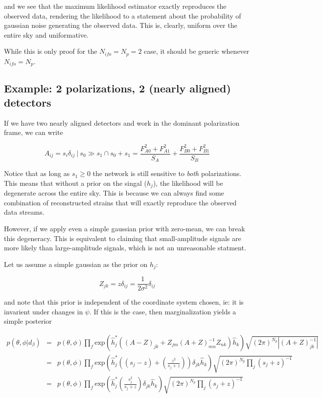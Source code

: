 \documentclass[10pt]{article}
\begin{document}
and we see that the maximum likelihood estimator exactly reproduces the observed data, rendering the likelihood to a statement about the probability of gaussian noise generating the observed data. This is, clearly, uniform over the entire sky and uniformative.

While this is only proof for the $N_{ifo}=N_{p}=2$ case, it should be generic whenever $N_{ifo}=N_{p}$.


\subsection{Example: 2 polarizations, 2 (nearly aligned) detectors}

If we have two nearly aligned detectors and work in the dominant polarization frame, we can write

\begin{equation}
A_{ij} = s_i \delta_{ij}\ |\ s_0 \gg s_1 \cap s_0+s_1 = \frac{F_{A0}^2 + F_{A1}^2}{S_A} + \frac{F_{B0}^2+F_{B1}^2}{S_B}
\end{equation}

Notice that as long as $s_1 \geq 0$ the network is still sensitive to \emph{both} polarizations. This means that without a prior on the singal ($h_j$), the likelihood will be degenerate across the entire sky. This is because we can always find some combination of reconstructed strains that will exactly reproduce the observed data streams.

However, if we apply even a simple gaussian prior with zero-mean, we can break this degeneracy. This is equivalent to claiming that small-amplitude signals are more likely than large-amplitude signals, which is not an unreasonable statment.

Let us assume a simple gaussian as the prior on $h_j$:

\begin{equation}
Z_{jk} = z \delta_{ij} = \frac{1}{2\sigma^2} \delta_{ij}
\end{equation}

and note that this prior is independent of the coordinate system chosen, ie: it is invarient under changes in $\psi$. If this is the case, then marginalization yields a simple posterior

\begin{eqnarray}
p(\theta, \phi| d_\beta) & = & p(\theta,\phi) \prod\limits_f \mathrm{exp}\left( \hat{h}_j^\ast \left( \left(A-Z\right)_{jk} + Z_{jm} \left(A+Z\right)^{-1}_{mn} Z_{nk} \right) \hat{h}_k \right) \sqrt{(2\pi)^{N_p} \left|\left(A+Z\right)^{-1}_{jk}\right|} \\
& = & p(\theta,\phi) \prod\limits_f \mathrm{exp}\left( \hat{h}_j^\ast \left( \left(s_j-z\right) + \left(\frac{z^2}{s_j+z}\right) \right)\delta_{jk} \hat{h}_k \right) \sqrt{(2\pi)^{N_p} \prod\limits_j (s_j+z)^{-1}} \\
& = & p(\theta,\phi) \prod\limits_f \mathrm{exp}\left( \hat{h}_j^\ast \left( \frac{s_j^2}{s_j+z} \right)\delta_{jk} \hat{h}_k \right) \sqrt{(2\pi)^{N_p} \prod\limits_j (s_j+z)^{-1}}
\end{eqnarray}
\end{document}
